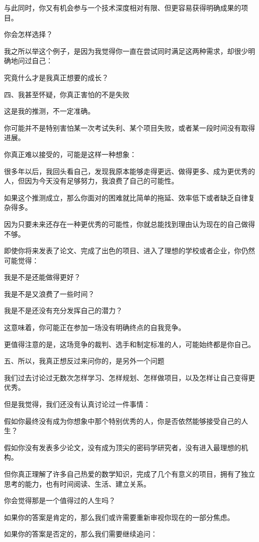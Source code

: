 与此同时，你又有机会参与一个技术深度相对有限、但更容易获得明确成果的项目。

你会怎样选择？

我之所以举这个例子，是因为我觉得你一直在尝试同时满足这两种需求，却很少明确地问过自己：

究竟什么才是我真正想要的成长？

四、我甚至怀疑，你真正害怕的不是失败

这是我的推测，不一定准确。

你可能并不是特别害怕某一次考试失利、某个项目失败，或者某一段时间没有取得进展。

你真正难以接受的，可能是这样一种想象：

很多年以后，我回头看自己，发现我原本能够走得更远、做得更多、成为更优秀的人，但因为今天没有足够努力，我浪费了自己的可能性。

如果这个推测成立，那么你面对的困难就比简单的拖延、效率低下或者缺乏自律复杂得多。

因为只要未来还存在一种更优秀的可能性，你就总能找到理由认为现在的自己做得不够。

即使你将来发表了论文、完成了出色的项目、进入了理想的学校或者企业，你仍然可能觉得：

我是不是还能做得更好？

我是不是又浪费了一些时间？

我是不是还没有充分发挥自己的潜力？

这意味着，你可能正在参加一场没有明确终点的自我竞争。

更值得注意的是，这场竞争的裁判、选手和制定标准的人，可能始终都是你自己。

五、所以，我真正想反过来问你的，是另外一个问题

我们过去讨论过无数次怎样学习、怎样规划、怎样做项目，以及怎样让自己变得更优秀。

但是我觉得，我们还没有认真讨论过一件事情：

假如你最终没有成为你想象中那个特别优秀的人，你是否依然能够接受自己的人生？

假如你没有发表多少论文，没有成为顶尖的密码学研究者，没有进入最理想的机构。

但你真正理解了许多自己热爱的数学知识，完成了几个有意义的项目，拥有了独立思考的能力，也有时间阅读、生活、建立关系。

你会觉得那是一个值得过的人生吗？

如果你的答案是肯定的，那么我们或许需要重新审视你现在的一部分焦虑。

如果你的答案是否定的，那么我们需要继续追问：

